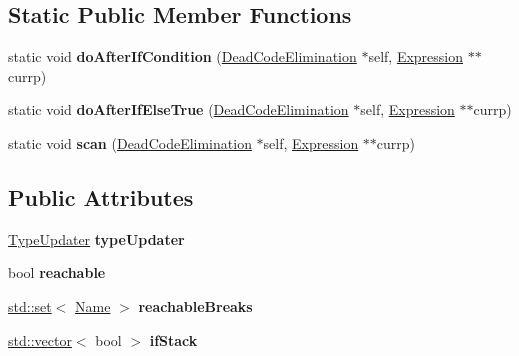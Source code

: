\subsection*{Static Public Member Functions}
\begin{DoxyCompactItemize}
\item 
\mbox{\label{structwasm_1_1_dead_code_elimination_aa15fe3d5d156f9c3a6a705f2879d9dbc}} 
static void {\bfseries do\+After\+If\+Condition} (\mbox{\hyperlink{structwasm_1_1_dead_code_elimination}{Dead\+Code\+Elimination}} $\ast$self, \mbox{\hyperlink{classwasm_1_1_expression}{Expression}} $\ast$$\ast$currp)
\item 
\mbox{\label{structwasm_1_1_dead_code_elimination_a89be240475e2aee0dbb47efe7164b72a}} 
static void {\bfseries do\+After\+If\+Else\+True} (\mbox{\hyperlink{structwasm_1_1_dead_code_elimination}{Dead\+Code\+Elimination}} $\ast$self, \mbox{\hyperlink{classwasm_1_1_expression}{Expression}} $\ast$$\ast$currp)
\item 
\mbox{\label{structwasm_1_1_dead_code_elimination_a99e938f6079b87fa1e0d5d45dbdde765}} 
static void {\bfseries scan} (\mbox{\hyperlink{structwasm_1_1_dead_code_elimination}{Dead\+Code\+Elimination}} $\ast$self, \mbox{\hyperlink{classwasm_1_1_expression}{Expression}} $\ast$$\ast$currp)
\end{DoxyCompactItemize}
\subsection*{Public Attributes}
\begin{DoxyCompactItemize}
\item 
\mbox{\label{structwasm_1_1_dead_code_elimination_a65ce3a8da0c948220be5a65b277179b5}} 
\mbox{\hyperlink{structwasm_1_1_type_updater}{Type\+Updater}} {\bfseries type\+Updater}
\item 
\mbox{\label{structwasm_1_1_dead_code_elimination_a58dc6042cb80fb3dc1b0a6369c1494f8}} 
bool {\bfseries reachable}
\item 
\mbox{\label{structwasm_1_1_dead_code_elimination_adeba960fb5f771a373c1fe389aa7ccc1}} 
\mbox{\hyperlink{classstd_1_1set}{std\+::set}}$<$ \mbox{\hyperlink{structwasm_1_1_name}{Name}} $>$ {\bfseries reachable\+Breaks}
\item 
\mbox{\label{structwasm_1_1_dead_code_elimination_a6a0d77a20125ea3554f9aa0ba0f70512}} 
\mbox{\hyperlink{classstd_1_1vector}{std\+::vector}}$<$ bool $>$ {\bfseries if\+Stack}
\end{DoxyCompactItemize}
